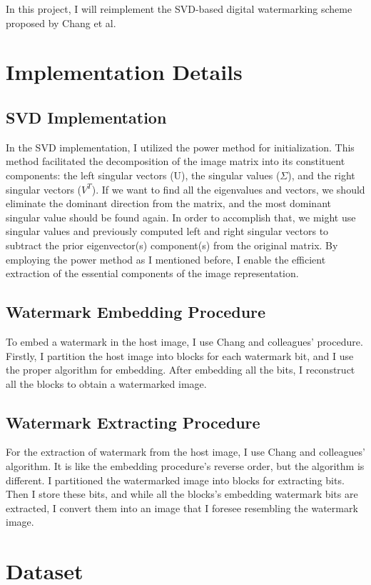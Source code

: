 \documentclass[conference]{IEEEtran}
\begin{document}
In this project, I will reimplement the SVD-based digital watermarking scheme proposed by Chang et al.

\section{Implementation Details}
\subsection{SVD Implementation}
In the SVD implementation, I utilized the power method for initialization. This method facilitated the decomposition of the image matrix into its constituent components: the left singular vectors (U), the singular values ($\Sigma$), and the right singular vectors ($V^T$). If we want to find all the eigenvalues and vectors, we should eliminate the dominant direction from the matrix, and the most dominant singular value should be found again. In order to accomplish that, we might use singular values and previously computed left and right singular vectors to subtract the prior eigenvector(s) component(s) from the original matrix. By employing the power method as I mentioned before, I enable the efficient extraction of the essential components of the image representation.
\subsection{Watermark Embedding Procedure}
To embed a watermark in the host image, I use Chang and colleagues' procedure. Firstly, I partition the host image into blocks for each watermark bit, and I use the proper algorithm for embedding. After embedding all the bits, I reconstruct all the blocks to obtain a watermarked image.
\subsection{Watermark Extracting Procedure}
For the extraction of watermark from the host image, I use Chang and colleagues' algorithm. It is like the embedding procedure's reverse order, but the algorithm is different. I partitioned the watermarked image into blocks for extracting bits. Then I store these bits, and while all the blocks's embedding watermark bits are extracted, I convert them into an image that I foresee resembling the watermark image.

\section{Dataset}
\end{document}
